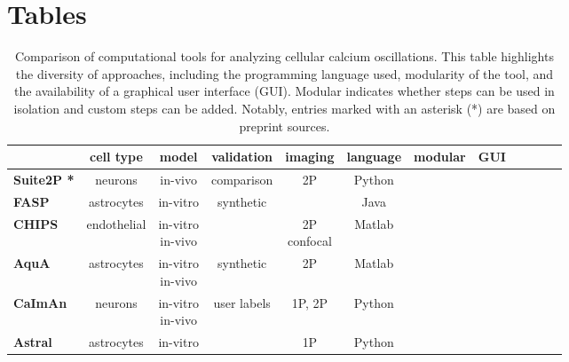 \documentclass[utf8]{FrontiersinHarvard}
\newcommand{\cmark}{\ding{51}} %
\newcommand{\xmark}{\textemdash} %
\begin{document}
    \section*{Tables}
    \bgroup
    \def\arraystretch{1.1}
    \begin{table}[htb]
        \centering
        \caption{Comparison of computational tools for analyzing cellular calcium oscillations. This table highlights the diversity of approaches, including the programming language used, modularity of the tool, and the availability of a graphical user interface (GUI). Modular indicates whether steps can be used in isolation and custom steps can be added. Notably, entries marked with an asterisk (*) are based on preprint sources. \newline}
        \label{tab:transposed-comparison}
        \tiny
        \begin{tabular}{|l|c|c|c|c|c|c|c|c|c|c|c|}
            \hline {}                                                       & \textbf{cell type} & \textbf{model} & \textbf{validation} & \textbf{imaging} & \textbf{language} & \textbf{modular} & \textbf{GUI} \\
            \hline \textbf{Suite2P\citep{pachitariu_suite2p_2017} *}        & neurons            & in-vivo        & comparison & 2P & Python & \cmark & \cmark \\
            \hline \textbf{FASP\citep{wang_automated_2017}}                 & astrocytes         & in-vitro       & synthetic           & \xmark & Java & \cmark & \cmark \\
            \hline \textbf{CHIPS\citep{barrett_chips_2018}} & endothelial & \makecell{in-vitro \\in-vivo} & \xmark & \makecell{2P \\confocal} & Matlab & \cmark & \cmark \\
            \hline \textbf{AquA\citep{wang_event-based_2018}}          & astrocytes         & \makecell{in-vitro       \\in-vivo} & synthetic          & 2P & Matlab & \xmark & \cmark \\
            \hline \textbf{CaImAn\citep{giovannucci_caiman_2019}} & neurons & \makecell{in-vitro \\in-vivo} & user labels & 1P, 2P & Python & \cmark & \cmark \\
            \hline \textbf{Astral\citep{dzyubenko_analysing_2021}} & astrocytes & in-vitro & \xmark & 1P & Python & \xmark & \cmark \\

\end{tabular}
\end{table}
\end{document}
